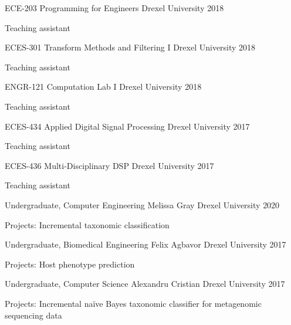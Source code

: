 \begin{cventries}
\cventry
    {ECE-203}
    {Programming for Engineers}
    {Drexel University}
    {2018}
    {\begin{cvitems}
        \item Teaching assistant
    \end{cvitems}}
   
\cventry
    {ECES-301}
    {Transform Methods and Filtering I}
    {Drexel University}
    {2018}
    {\begin{cvitems}
        \item Teaching assistant
    \end{cvitems}}
    
\cventry
    {ENGR-121}
    {Computation Lab I}
    {Drexel University}
    {2018}
    {\begin{cvitems}
        \item Teaching assistant
    \end{cvitems}}
    
\cventry
    {ECES-434}
    {Applied Digital Signal Processing}
    {Drexel University}
    {2017}
    {\begin{cvitems}
        \item Teaching assistant
    \end{cvitems}}

\cventry
    {ECES-436}
    {Multi-Disciplinary DSP}
    {Drexel University}
    {2017}
    {\begin{cvitems}
        \item Teaching assistant
    \end{cvitems}}
    
\end{cventries}


\begin{cventries}

\cventry
    {Undergraduate, Computer Engineering}
    {Melissa Gray}
    {Drexel University}
    {2020}
    {\begin{cvitems}
        \item Projects: Incremental taxonomic classification
    \end{cvitems}}
    
\cventry
    {Undergraduate, Biomedical Engineering}
    {Felix Agbavor}
    {Drexel University}
    {2017}
    {\begin{cvitems}
        \item Projects: Host phenotype prediction
    \end{cvitems}}
    
\cventry
    {Undergraduate, Computer Science}
    {Alexandru Cristian}
    {Drexel University}
    {2017}
    {\begin{cvitems}
        \item Projects: Incremental na\"ive Bayes taxonomic classifier for metagenomic sequencing data 
    \end{cvitems}}

\end{cventries}

